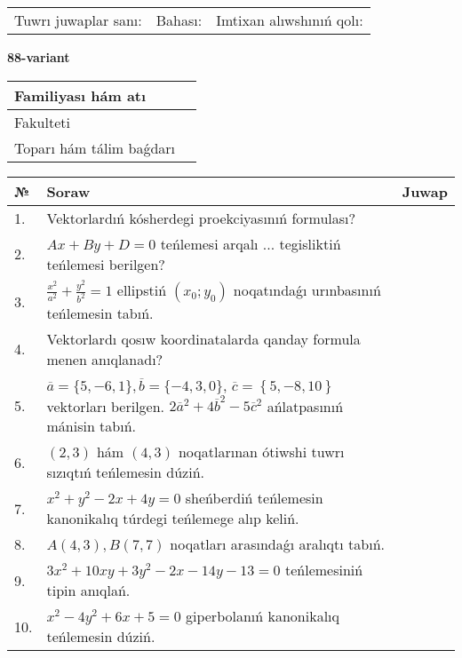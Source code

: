 \documentclass{article}
\begin{document}
\vspace{1cm}

\begin{tabular}{lll}
Tuwrı juwaplar sanı: \underline{\hspace{1.5cm}} & 
Bahası: \underline{\hspace{1.5cm}} & 
Imtixan alıwshınıń qolı: \underline{\hspace{2cm}} \\
\end{tabular}

\egroup

\newpage


\textbf{88-variant}\\

\bgroup
\def\arraystretch{1.6} %

\begin{tabular}{|m{5.7cm}|m{9.5cm}|}
\hline
Familiyası hám atı & \\
\hline
Fakulteti  & \\
\hline
Toparı hám tálim baǵdarı  & \\
\hline
\end{tabular}

\vspace{1cm}

\begin{tabular}{|m{0.7cm}|m{10cm}|m{4cm}|}
\hline
№ & Soraw & Juwap \\
\hline
1. & Vektorlardıń kósherdegi proekciyasınıń formulası? &  \\
\hline
2. & $Ax+By+D=0$ teńlemesi arqalı ... tegisliktiń teńlemesi berilgen? &  \\
\hline
3. & $\frac{x^2}{a^2}+\frac{y^2}{b^2}=1$ ellipstiń $(x_0;y_0)$ noqatındaǵı urınbasınıń teńlemesin tabıń. &  \\
\hline
4. & Vektorlardı qosıw koordinatalarda qanday formula menen anıqlanadı? &  \\
\hline
5. & $\overline{a}=\{5,-6, 1 \}, \overline{b}=\{-4, 3, 0 \} $, $\overline{c}=\left\{ 5,-8, 10 \right\}$ vektorları berilgen. $2{\overline{a}}^{2}+4{\overline{b}}^{2}-5{\overline{c}}^{2}$ ańlatpasınıń mánisin tabıń. &  \\
\hline
6. & $(2, 3)$ hám $(4, 3)$ noqatlarınan ótiwshi tuwrı sızıqtıń teńlemesin dúziń. &  \\
\hline
7. & $x^{2}+y^{2}-2x+4y=0$ sheńberdiń teńlemesin kanonikalıq túrdegi teńlemege alıp keliń. &  \\
\hline
8. & $A(4, 3), B(7, 7)$ noqatları arasındaǵı aralıqtı tabıń. &  \\
\hline
9. & $3x^{2}+10xy+3y^{2}-2x-14y-13=0$ teńlemesiniń tipin anıqlań. &  \\
\hline
10. & $x^{2}-4y^{2}+6x+5=0$ giperbolanıń kanonikalıq teńlemesin dúziń. &  \\
\hline
\end{tabular}
\end{document}
